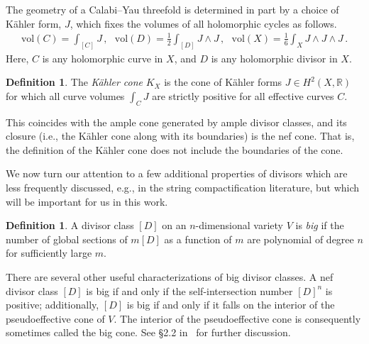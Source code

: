 \documentclass[11pt,dvipsnames]{article}
\theoremstyle{definition}
\newtheorem{definition}[theorem]{Definition}
\begin{document}
The geometry of a Calabi--Yau threefold is determined in part by a choice of K\"ahler form, $J$, which fixes the volumes of all holomorphic cycles as follows.
\begin{align}
    \text{vol}(C) = \int_{[C]} J\,, \ \ \ \text{vol}(D) = \frac{1}{2}\int_{[D]} J \wedge J\,, \ \ \ \text{vol}(X) = \frac{1}{6}\int_{X} J \wedge J \wedge J\,.
    \label{eq:calibrated_vols}
\end{align}
Here, $C$ is any holomorphic curve in $X$, and $D$ is any holomorphic divisor in $X$. 
\begin{definition}
    The \textit{K\"ahler cone} $K_X$ is the cone of K\"ahler forms $J \in H^2(X,\mathbb{R})$ for which all curve volumes $\int_{C} J$ are strictly positive for all effective curves $C$.
\end{definition}
This coincides with the ample cone generated by ample divisor classes, and its closure (i.e., the K\"ahler cone along with its boundaries) is the nef cone. That is, the definition of the K\"ahler cone does not include the boundaries of the cone.

We now turn our attention to a few additional properties of divisors which are less frequently discussed, e.g., in the string compactification literature, but which will be important for us in this work.
\begin{definition}
    A divisor class $[D]$ on an $n$-dimensional variety $V$ is \textit{big} if the number of global sections of $m[D]$ as a function of $m$ are polynomial of degree $n$ for sufficiently large $m$.
\end{definition}
There are several other useful characterizations of big divisor classes. A nef divisor class $[D]$ is big if and only if the self-intersection number $[D]^n$ is positive; additionally, $[D]$ is big if and only if it falls on the interior of the pseudoeffective cone of $V$. The interior of the pseudoeffective cone is consequently sometimes called the big cone. See \S2.2 in~\cite{lazarsfeld2017positivity} for further discussion.
\end{document}
